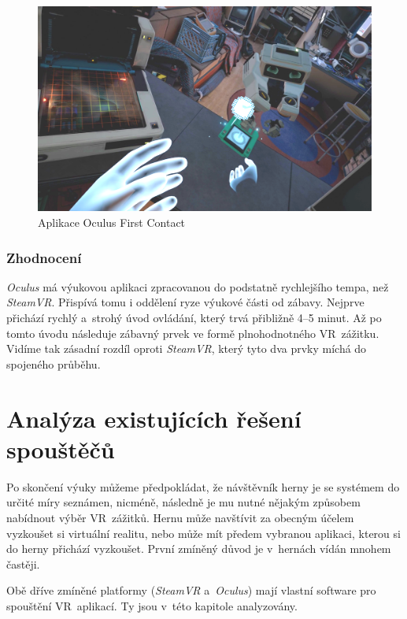 \begin{figure}[h!]
\centering
\includegraphics[width=12cm]{src/assets/oculus-first-contact.png}
\caption{Aplikace Oculus First Contact}
\end{figure}

\subsubsection{Zhodnocení}\label{zhodnocenuxed-1}

\emph{Oculus} má výukovou aplikaci zpracovanou do podstatně rychlejšího
tempa, než \emph{SteamVR}. Přispívá tomu i oddělení ryze výukové části od zábavy. Nejprve přichází rychlý a~strohý úvod ovládání, který trvá
přibližně 4--5 minut. Až po tomto úvodu následuje zábavný prvek
ve formě plnohodnotného VR~zážitku. Vidíme tak zásadní rozdíl oproti
\emph{SteamVR}, který tyto dva prvky míchá do spojeného průběhu.

\section{Analýza existujících řešení
spouštěčů}\label{analuxfdza-existujuxedcuxedch-ux159eux161enuxed-spouux161tux11bux10dux16f}

Po skončení výuky můžeme předpokládat, že návštěvník herny je se
systémem do určité míry seznámen, nicméně, následně je mu nutné nějakým způsobem
nabídnout výběr VR~zážitků. Hernu může navštívit za obecným účelem vyzkoušet si virtuální realitu, nebo může mít předem vybranou aplikaci, kterou si do herny přichází vyzkoušet. První
zmíněný důvod je v~hernách vídán mnohem častěji.

Obě dříve zmíněné platformy (\emph{SteamVR} a~\emph{Oculus}) mají
vlastní software pro spouštění VR~aplikací. Ty jsou v~této kapitole
analyzovány.

